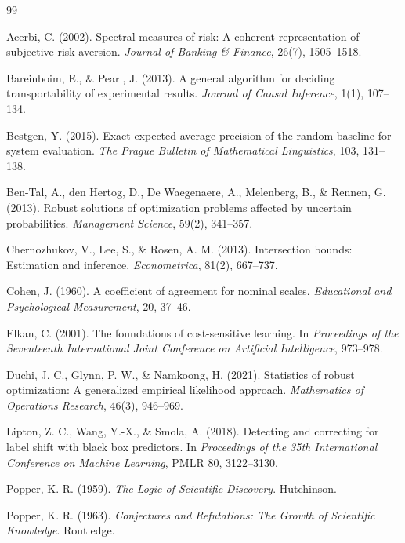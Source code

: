 \documentclass[11pt]{article}
\theoremstyle{remark}
\begin{document}
\begin{thebibliography}{99}
\setlength{\itemsep}{0.25em}

Acerbi, C. (2002).
Spectral measures of risk: A coherent representation of subjective risk aversion.
\emph{Journal of Banking \& Finance}, 26(7), 1505--1518.

Bareinboim, E., \& Pearl, J. (2013).
A general algorithm for deciding transportability of experimental results.
\emph{Journal of Causal Inference}, 1(1), 107--134.

Bestgen, Y. (2015).
Exact expected average precision of the random baseline for system evaluation.
\emph{The Prague Bulletin of Mathematical Linguistics}, 103, 131--138.

Ben-Tal, A., den Hertog, D., De Waegenaere, A., Melenberg, B., \& Rennen, G. (2013).
Robust solutions of optimization problems affected by uncertain probabilities.
\emph{Management Science}, 59(2), 341--357.

Chernozhukov, V., Lee, S., \& Rosen, A. M. (2013).
Intersection bounds: Estimation and inference.
\emph{Econometrica}, 81(2), 667--737.

Cohen, J. (1960).
A coefficient of agreement for nominal scales.
\emph{Educational and Psychological Measurement}, 20, 37--46.

Elkan, C. (2001).
The foundations of cost-sensitive learning.
In \emph{Proceedings of the Seventeenth International Joint Conference on Artificial Intelligence}, 973--978.

Duchi, J. C., Glynn, P. W., \& Namkoong, H. (2021).
Statistics of robust optimization: A generalized empirical likelihood approach.
\emph{Mathematics of Operations Research}, 46(3), 946--969.

Lipton, Z. C., Wang, Y.-X., \& Smola, A. (2018).
Detecting and correcting for label shift with black box predictors.
In \emph{Proceedings of the 35th International Conference on Machine Learning}, PMLR 80, 3122--3130.

Popper, K. R. (1959).
\emph{The Logic of Scientific Discovery}.
Hutchinson.

Popper, K. R. (1963).
\emph{Conjectures and Refutations: The Growth of Scientific Knowledge}.
Routledge.


\end{thebibliography}
\end{document}
